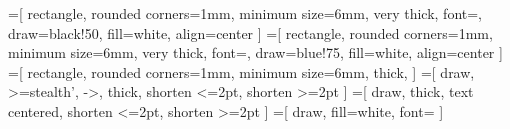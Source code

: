 =[
    rectangle,
    rounded corners=1mm,
    minimum size=6mm,
    very thick,
    font=\normalsize,
    draw=black!50,
    fill=white,
    align=center
]            
=[
    rectangle,
    rounded corners=1mm,
    minimum size=6mm,
    very thick,
    font=\normalsize,
    draw=blue!75,
    fill=white,
    align=center
]
=[
    rectangle,
    rounded corners=1mm,
    minimum size=6mm,
    thick,
]
=[
   draw,
   >=stealth',	%
   ->,
   thick,
   shorten <=2pt,
   shorten >=2pt
]
=[
    draw,
    thick,
    text centered,
    shorten <=2pt,
    shorten >=2pt
]
=[
    draw,
    fill=white,
    font=\tiny
]